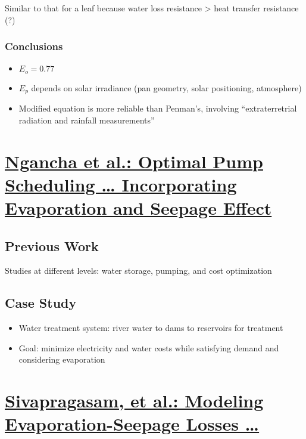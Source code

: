 \documentclass{article}
\begin{document}
Similar to that for a leaf because water loss resistance > heat transfer resistance (?)

\subsubsection{Conclusions}

\begin{itemize}
    \item $E_o = 0.77$
    \item $E_p$ depends on solar irradiance (pan geometry, solar positioning, atmosphere)
    \item Modified equation is more reliable than Penman’s, involving “extraterretrial radiation and rainfall measurements”
\end{itemize}

\newpage

\section{\href{https://ieeexplore.ieee.org/document/8535643}{Ngancha et al.: Optimal Pump Scheduling … Incorporating Evaporation and Seepage Effect}}

\subsection{Previous Work}

Studies at different levels: water storage, pumping, and cost optimization

\subsection{Case Study}

\begin{itemize}
    \item Water treatment system: river water to dams to reservoirs for treatment
    \item Goal: minimize electricity and water costs while satisfying demand and considering evaporation
\end{itemize}

\newpage

\section{\href{https://link.springer.com/article/10.1007/s11269-008-9303-3}{Sivapragasam, et al.: Modeling Evaporation-Seepage Losses …}}
\end{document}
